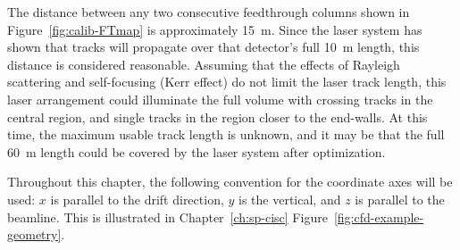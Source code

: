The distance between any two consecutive feedthrough columns shown in Figure~\ref{fig:calib-FTmap} is approximately \SI{15}{\m}. Since the  laser system has shown that tracks will propagate over that detector's full \SI{10}{\m} length, this distance is considered reasonable. Assuming that the effects of Rayleigh scattering and self-focusing (Kerr effect) do not limit the laser track length, this laser arrangement could illuminate the full volume with crossing tracks in the central region, and single tracks %
in the region closer to the end-walls.  %
At this time, the maximum usable track length is unknown, and it may be that the full \SI{60}{\m} \detmodule length could be covered by the laser system after optimization.

Throughout this chapter, the following convention for the coordinate axes will be used: $x$ is parallel to the drift direction, $y$ is the vertical, and $z$ is parallel to the beamline. This is illustrated in Chapter~\ref{ch:sp-cisc} Figure~\ref{fig:cfd-example-geometry}.
